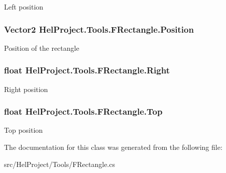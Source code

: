 Left position 

\hypertarget{class_hel_project_1_1_tools_1_1_f_rectangle_a77d6c7b832edfa34e2a4402c400d8e59}{}
\subsubsection[{Position}]{\setlength{\rightskip}{0pt plus 5cm}Vector2 Hel\+Project.\+Tools.\+F\+Rectangle.\+Position\hspace{0.3cm}{\ttfamily [get]}}\label{class_hel_project_1_1_tools_1_1_f_rectangle_a77d6c7b832edfa34e2a4402c400d8e59}


Position of the rectangle 

\hypertarget{class_hel_project_1_1_tools_1_1_f_rectangle_ad758ded56c229a9a801193c0671cd5da}{}
\subsubsection[{Right}]{\setlength{\rightskip}{0pt plus 5cm}float Hel\+Project.\+Tools.\+F\+Rectangle.\+Right\hspace{0.3cm}{\ttfamily [get]}}\label{class_hel_project_1_1_tools_1_1_f_rectangle_ad758ded56c229a9a801193c0671cd5da}


Right position 

\hypertarget{class_hel_project_1_1_tools_1_1_f_rectangle_a40203015f0e458f97ad0f2ba7017da7d}{}
\subsubsection[{Top}]{\setlength{\rightskip}{0pt plus 5cm}float Hel\+Project.\+Tools.\+F\+Rectangle.\+Top\hspace{0.3cm}{\ttfamily [get]}}\label{class_hel_project_1_1_tools_1_1_f_rectangle_a40203015f0e458f97ad0f2ba7017da7d}


Top position 



The documentation for this class was generated from the following file\+:\begin{DoxyCompactItemize}
\item 
src/\+Hel\+Project/\+Tools/F\+Rectangle.\+cs\end{DoxyCompactItemize}
